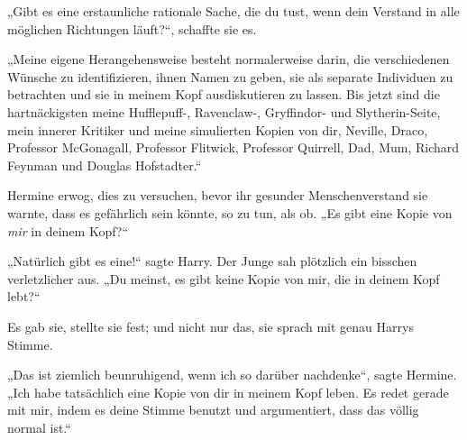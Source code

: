 „Gibt es eine erstaunliche rationale Sache, die du tust, wenn dein Verstand in alle möglichen Richtungen läuft?“, schaffte sie es.

„Meine eigene Herangehensweise besteht normalerweise darin, die verschiedenen Wünsche zu identifizieren, ihnen Namen zu geben, sie als separate Individuen zu betrachten und sie in meinem Kopf ausdiskutieren zu lassen. Bis jetzt sind die hartnäckigsten meine Hufflepuff-, Ravenclaw-, Gryffindor- und Slytherin-Seite, mein innerer Kritiker und meine simulierten Kopien von dir, Neville, Draco, Professor McGonagall, Professor Flitwick, Professor Quirrell, Dad, Mum, Richard Feynman und Douglas Hofstadter.“

Hermine erwog, dies zu versuchen, bevor ihr gesunder Menschenverstand sie warnte, dass es gefährlich sein könnte, so zu tun, als ob.
„Es gibt eine Kopie von \emph{mir} in deinem Kopf?“

„Natürlich gibt es eine!“ sagte Harry. Der Junge sah plötzlich ein bisschen verletzlicher aus.
„Du meinst, es gibt keine Kopie von mir, die in deinem Kopf lebt?“

Es gab sie, stellte sie fest; und nicht nur das, sie sprach mit genau Harrys Stimme.

„Das ist ziemlich beunruhigend, wenn ich so darüber nachdenke“, sagte Hermine.
„Ich habe tatsächlich eine Kopie von dir in meinem Kopf leben. Es redet gerade mit mir, indem es deine Stimme benutzt und argumentiert, dass das völlig normal ist.“

